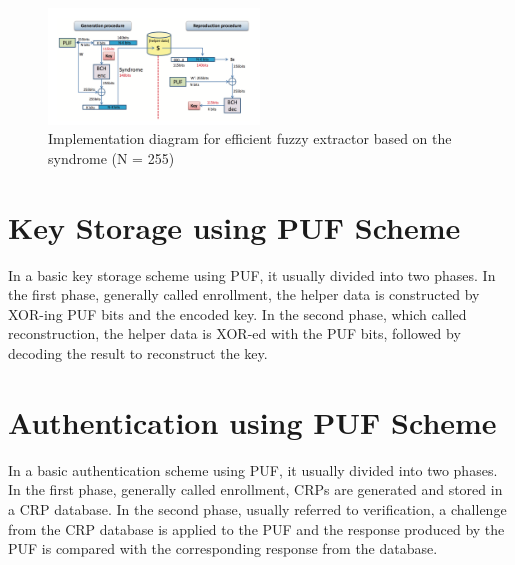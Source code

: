 \begin{figure}[tph!]
	\centerline{\includegraphics[width={0.5\textwidth}]{images/crypt_key_generation}}
    \caption{Implementation diagram for efficient fuzzy extractor based on the syndrome (N = 255) \cite{cryptographic_key_generation}}
    \label{fig:cryptographic_key_generation}
\end{figure}



\section{Key Storage using PUF Scheme}

In a basic key storage scheme using PUF, it usually divided into two phases.  In the first phase, generally called enrollment, the helper data is constructed by XOR-ing PUF bits and the encoded key. In the second phase, which called reconstruction, the helper data is XOR-ed with the PUF bits, followed by decoding the result to reconstruct the key.



\section{Authentication using PUF Scheme}

In a basic authentication scheme using PUF, it usually divided into two phases.  In the first phase, generally called enrollment, CRPs are generated and stored in a CRP database. In the second phase, usually referred to verification, a challenge from the CRP database is applied to the PUF and the response produced by the PUF is compared with the corresponding response from the database.
